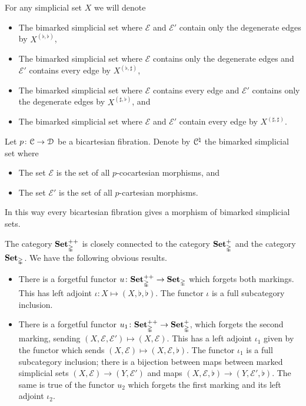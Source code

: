 \documentclass[main.tex]{subfiles}
\begin{document}
\begin{example}
  For any simplicial set $X$ we will denote
  \begin{itemize}
    \item The bimarked simplicial set where $\mathcal{E}$ and $\mathcal{E}'$ contain only the degenerate edges by $X^{( \flat, \flat )}$,

    \item The bimarked simplicial set where $\mathcal{E}$ contains only the degenerate edges and $\mathcal{E}'$ contains every edge by $X^{( \flat, \sharp )}$,

    \item The bimarked simplicial set where $\mathcal{E}$ contains every edge and $\mathcal{E}'$ contains only the degenerate edges by $X^{( \sharp, \flat )}$, and

    \item The bimarked simplicial set where $\mathcal{E}$ and $\mathcal{E}'$ contain every edge by $X^{( \sharp, \sharp )}$.
  \end{itemize}
\end{example}

\begin{example}
  \label{eg:bicartesian_marking}
  Let $p\colon \mathcal{C} \to \mathcal{D}$ be a bicartesian fibration. Denote by $\mathcal{C}^{\natural}$ the bimarked simplicial set where
  \begin{itemize}
    \item The set $\mathcal{E}$ is the set of all $p$-cocartesian morphisms, and

    \item The set $\mathcal{E}'$ is the set of all $p$-cartesian morphisms.
  \end{itemize}

  In this way every bicartesian fibration gives a morphism of bimarked simplicial sets.
\end{example}

The category $\mathbf{Set}_{\mathbb{\Delta}}^{++}$ is closely connected to the category $\mathbf{Set}_{\mathbb{\Delta}}^{+}$ and the category $\mathbf{Set}_{\mathbb{\Delta}}$. We have the following obvious results.
\begin{itemize}
  \item There is a forgetful functor $u\colon \mathbf{Set}_{\mathbb{\Delta}}^{++} \to \mathbf{Set}_{\mathbb{\Delta}}$ which forgets both markings. This has left adjoint $\iota\colon X \mapsto (X, \flat, \flat)$. The functor $\iota$ is a full subcategory inclusion.

  \item There is a forgetful functor $u_{1}\colon \mathbf{Set}_{\mathbb{\Delta}}^{++} \to \mathbf{Set}_{\mathbb{\Delta}}^{+}$, which forgets the second marking, sending $(X, \mathcal{E}, \mathcal{E}') \mapsto (X, \mathcal{E})$. This has a left adjoint $\iota_{1}$ given by the functor which sends $(X, \mathcal{E}) \mapsto (X, \mathcal{E}, \flat)$. The functor $\iota_{1}$ is a full subcategory inclusion; there is a bijection between maps between marked simplicial sets $(X, \mathcal{E}) \to (Y, \mathcal{E}')$ and maps $(X, \mathcal{E}, \flat) \to (Y, \mathcal{E}', \flat)$. The same is true of the functor $u_{2}$ which forgets the first marking and its left adjoint $\iota_{2}$.
\end{itemize}
\end{document}
